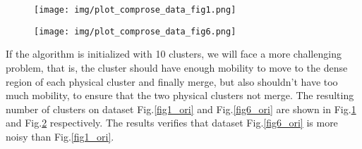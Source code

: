 \documentclass[journal]{IEEEtran}
\begin{document}
\begin{figure}[htb]
\centering
\texttt{[image: img/plot\_comprose\_data\_fig1.png]}
\label{fig1_comprose}
\end{figure}
\begin{figure}[htb]
\centering
\texttt{[image: img/plot\_comprose\_data\_fig6.png]}
\label{fig6_comprose}
\end{figure}
If the algorithm is initialized with 10 clusters, we will face a more challenging problem, that is, the cluster should have enough mobility to move to the dense region of each physical cluster and finally merge, but also shouldn't have too much mobility, to ensure that the two physical clusters not merge.
The resulting number of clusters on dataset Fig.\ref{fig1_ori} and Fig.\ref{fig6_ori} are shown in Fig.\ref{fig1_comprose} and Fig.\ref{fig6_comprose} respectively. The results verifies that dataset Fig.\ref{fig6_ori} is more noisy than Fig.\ref{fig1_ori}. 





\end{document}
